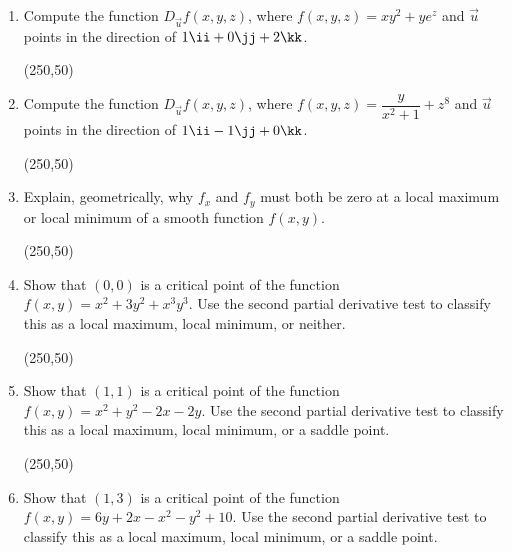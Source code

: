 \documentclass[12pt]{article}
\begin{document}
\begin{enumerate}[label=\arabic*.,start=2,leftmargin=*,itemsep=0pt]
\vfill
\begin{flushright}
\framebox(250,50){}
\end{flushright}

\newpage

\item Compute the function $D_{\vec{u}}f(x,y,z)$, where
$f(x,y,z)=xy^2+ye^z$ and $\vec{u}$ points in the direction of
$1\ii+0\jj+2\kk$.

\vfill
\begin{flushright}
\framebox(250,50){}
\end{flushright}

\item Compute the function $D_{\vec{u}}f(x,y,z)$, where
$f(x,y,z)=\dfrac{y}{x^2+1}+z^8$ and $\vec{u}$ points in the direction of
$1\ii-1\jj+0\kk$.

\vfill
\begin{flushright}
\framebox(250,50){}
\end{flushright}

\newpage

\item Explain, geometrically, why $f_x$ and $f_y$ must both be zero at a local
maximum or local minimum of a smooth function $f(x,y)$.

\vfill
\begin{flushright}
\framebox(250,50){}
\end{flushright}

\item Show that $(0,0)$ is a critical point of the function
$f(x,y)=x^2+3y^2+x^3y^3$. Use the second partial derivative test to classify
this as a local maximum, local minimum, or neither.

\vfill
\begin{flushright}
\framebox(250,50){}
\end{flushright}

\newpage

\item Show that $(1,1)$ is a critical point of the function
$f(x,y)=x^2+y^2-2x-2y$. Use the second partial derivative test to classify this
as a local maximum, local minimum, or a saddle point.

\vfill
\begin{flushright}
\framebox(250,50){}
\end{flushright}

\item Show that $(1,3)$ is a critical point of the function
$f(x,y)=6y+2x-x^2-y^2+10$. Use the second partial derivative test to classify
this as a local maximum, local minimum, or a saddle point.


\end{enumerate}
\end{document}
